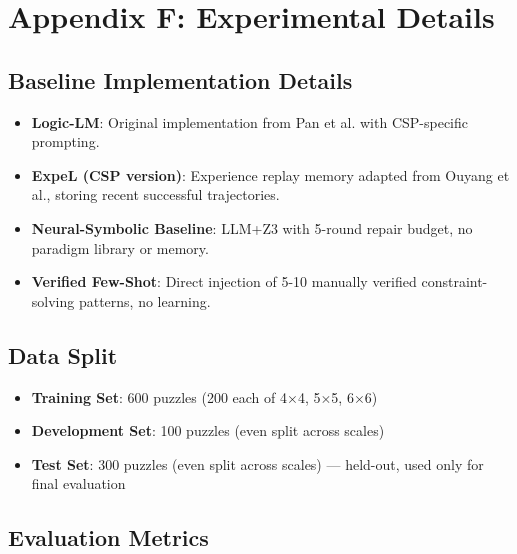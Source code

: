 
\section{Appendix F: Experimental Details}

\subsection{Baseline Implementation Details}

\begin{itemize}
    \item \textbf{Logic-LM}: Original implementation from Pan et al. with CSP-specific prompting.
    \item \textbf{ExpeL (CSP version)}: Experience replay memory adapted from Ouyang et al., storing recent successful trajectories.
    \item \textbf{Neural-Symbolic Baseline}: LLM+Z3 with 5-round repair budget, no paradigm library or memory.
    \item \textbf{Verified Few-Shot}: Direct injection of 5-10 manually verified constraint-solving patterns, no learning.
\end{itemize}

\subsection{Data Split}

\begin{itemize}
    \item \textbf{Training Set}: 600 puzzles (200 each of 4$\times$4, 5$\times$5, 6$\times$6)
    \item \textbf{Development Set}: 100 puzzles (even split across scales)
    \item \textbf{Test Set}: 300 puzzles (even split across scales) — held-out, used only for final evaluation
\end{itemize}

\subsection{Evaluation Metrics}

